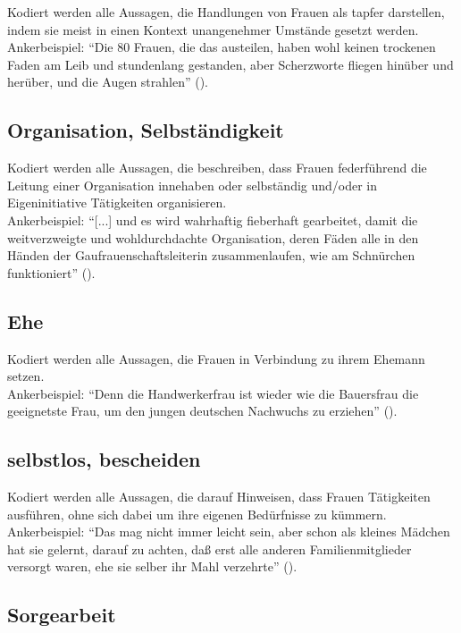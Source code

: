 \documentclass[12pt, titlepage=true, toc=bib]{scrartcl}
\begin{document}
{Kodiert werden alle Aussagen, die Handlungen von Frauen als tapfer darstellen, indem sie meist in einen Kontext unangenehmer Umstände gesetzt werden.\\
Ankerbeispiel: "`Die 80 Frauen, die das austeilen, haben wohl keinen trockenen Faden am Leib und stundenlang gestanden, aber Scherzworte fliegen hinüber und herüber, und die Augen strahlen"' (\cite[775]{a._v._s._kameradschaft_1936}).

\subsection*{Organisation, Selbständigkeit}

Kodiert werden alle Aussagen, die beschreiben, dass Frauen federführend die Leitung einer Organisation innehaben oder selbständig und/oder in Eigeninitiative Tätigkeiten organisieren.\\
Ankerbeispiel: "`[...] und es wird wahrhaftig fieberhaft gearbeitet, damit die weitverzweigte und wohldurchdachte Organisation, deren Fäden alle in den Händen der Gaufrauenschaftsleiterin zusammenlaufen, wie am Schnürchen funktioniert"' (\cite[778]{a._v._s._kameradschaft_1936}).

\subsection*{Ehe}

Kodiert werden alle Aussagen, die Frauen in Verbindung zu ihrem Ehemann setzen.\\
Ankerbeispiel: "`Denn die Handwerkerfrau ist wieder wie die Bauersfrau die geeignetste Frau, um den jungen deutschen Nachwuchs zu erziehen"' (\cite[836]{scholtz-klink_frauen_1936}).

\subsection*{selbstlos, bescheiden}

Kodiert werden alle Aussagen, die darauf Hinweisen, dass Frauen Tätigkeiten ausführen, ohne sich dabei um ihre eigenen Bedürfnisse zu kümmern.\\
Ankerbeispiel: "`Das mag nicht immer leicht sein, aber schon als kleines Mädchen hat sie gelernt, darauf zu achten, daß erst alle anderen Familienmitglieder versorgt waren, ehe sie selber ihr Mahl verzehrte"' (\cite[5]{friewart_japanisches_1941}).

\subsection*{Sorgearbeit}

}
\end{document}
